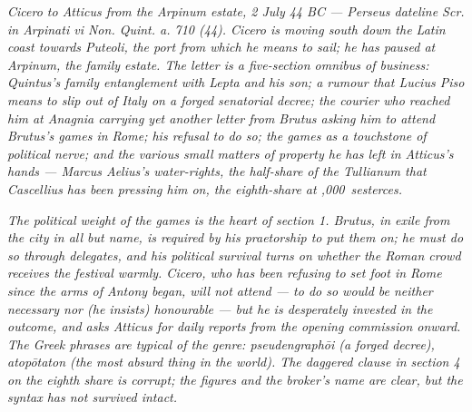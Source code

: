 
\textit{Cicero to Atticus from the Arpinum estate, 2 July 44 BC
--- Perseus dateline \textit{Scr. in Arpinati vi Non. Quint. a.
710 (44)}. Cicero is moving south down the Latin coast towards
Puteoli, the port from which he means to sail; he has paused at
Arpinum, the family estate. The letter is a five-section omnibus
of business: Quintus's family entanglement with Lepta and his son;
a rumour that Lucius Piso means to slip out of Italy on a forged
senatorial decree; the courier who reached him at Anagnia carrying
yet another letter from Brutus asking him to attend Brutus's games
in Rome; his refusal to do so; the games as a touchstone of
political nerve; and the various small matters of property he has
left in Atticus's hands --- Marcus Aelius's water-rights, the
half-share of the Tullianum that Cascellius has been pressing him
on, the eighth-share at ,000\dag\ sesterces.}

\textit{The political weight of the games is the heart of section
1. Brutus, in exile from the city in all but name, is required by
his praetorship to put them on; he must do so through delegates,
and his political survival turns on whether the Roman crowd
receives the festival warmly. Cicero, who has been refusing to set
foot in Rome since the arms of Antony began, will not attend ---
to do so would be neither necessary nor (he insists) honourable
--- but he is desperately invested in the outcome, and asks
Atticus for daily reports from the opening commission onward. The
Greek phrases are typical of the genre: \textit{pseudengraph\=oi}
(a forged decree), \textit{atop\=otaton} (the most absurd thing in
the world). The daggered clause in section 4 on the eighth share
is corrupt; the figures and the broker's name are clear, but the
syntax has not survived intact.}

